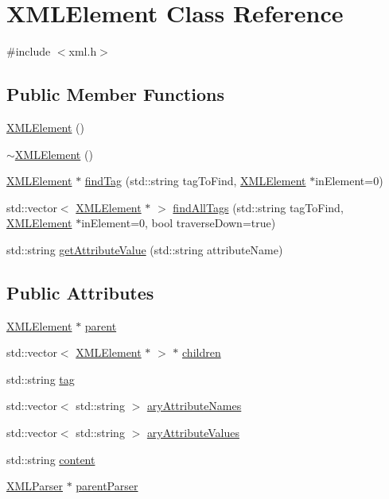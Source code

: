 \hypertarget{class_x_m_l_element}{\section{X\-M\-L\-Element Class Reference}
\label{class_x_m_l_element}
}


{\ttfamily \#include $<$xml.\-h$>$}

\subsection*{Public Member Functions}
\begin{DoxyCompactItemize}
\item 
\hyperlink{class_x_m_l_element_ae6e0c3440c60484c1fa97e06efdae280}{X\-M\-L\-Element} ()
\item 
\hyperlink{class_x_m_l_element_a6c0b01c341ebdcc3be892eb34023faa9}{$\sim$\-X\-M\-L\-Element} ()
\item 
\hyperlink{class_x_m_l_element}{X\-M\-L\-Element} $\ast$ \hyperlink{class_x_m_l_element_aa022ff51872cd499e943d22fd5f52bbc}{find\-Tag} (std\-::string tag\-To\-Find, \hyperlink{class_x_m_l_element}{X\-M\-L\-Element} $\ast$in\-Element=0)
\item 
std\-::vector$<$ \hyperlink{class_x_m_l_element}{X\-M\-L\-Element} $\ast$ $>$ \hyperlink{class_x_m_l_element_aa92b88f887c16bed4f72d21e32d27789}{find\-All\-Tags} (std\-::string tag\-To\-Find, \hyperlink{class_x_m_l_element}{X\-M\-L\-Element} $\ast$in\-Element=0, bool traverse\-Down=true)
\item 
std\-::string \hyperlink{class_x_m_l_element_af7e7c8a201337dacffad639153a4dd1c}{get\-Attribute\-Value} (std\-::string attribute\-Name)
\end{DoxyCompactItemize}
\subsection*{Public Attributes}
\begin{DoxyCompactItemize}
\item 
\hyperlink{class_x_m_l_element}{X\-M\-L\-Element} $\ast$ \hyperlink{class_x_m_l_element_a6a1caf750f2b2d2b7c6d763b626517cb}{parent}
\item 
std\-::vector$<$ \hyperlink{class_x_m_l_element}{X\-M\-L\-Element} $\ast$ $>$ $\ast$ \hyperlink{class_x_m_l_element_a09644540f5dd8aeb16544332698ea940}{children}
\item 
std\-::string \hyperlink{class_x_m_l_element_a4f41640885a8b5dc7996f4828a129f59}{tag}
\item 
std\-::vector$<$ std\-::string $>$ \hyperlink{class_x_m_l_element_a6c39511e160c6e92a44f047de0609003}{ary\-Attribute\-Names}
\item 
std\-::vector$<$ std\-::string $>$ \hyperlink{class_x_m_l_element_aa3bb2a1409e55967e75299ef1c19279e}{ary\-Attribute\-Values}
\item 
std\-::string \hyperlink{class_x_m_l_element_ac2951cb6eff86940278169d76f7c4ef6}{content}
\item 
\hyperlink{class_x_m_l_parser}{X\-M\-L\-Parser} $\ast$ \hyperlink{class_x_m_l_element_a016e6b0f8fb87e7dae94e5d3aa08755c}{parent\-Parser}
\end{DoxyCompactItemize}


